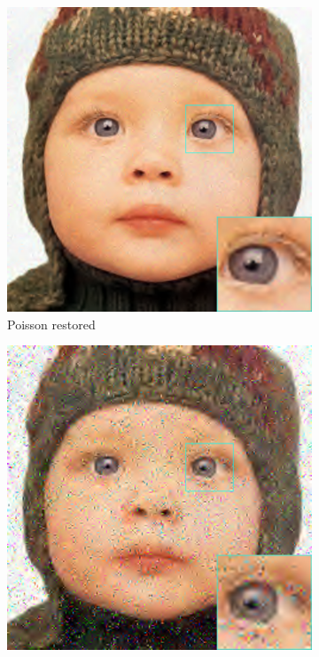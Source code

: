 \begin{figure}
\begin{subfigure}{0.24\textwidth}
		\includegraphics[width=\textwidth]{images/exp3.1/poisson.png}
		\caption{Poisson restored}
	\end{subfigure}
	\begin{subfigure}{0.24\textwidth}
		\includegraphics[width=\textwidth]{images/exp3.1/salt.png}

\end{subfigure}
\end{figure}
